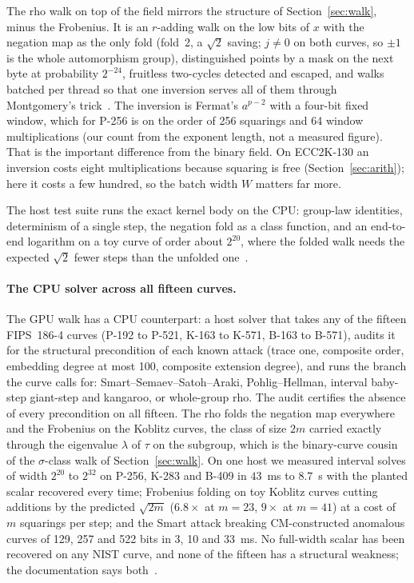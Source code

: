 The rho walk on top of the field mirrors the structure of
Section~\ref{sec:walk}, minus the Frobenius. It is an $r$-adding walk
on the low bits of $x$ with the negation map as the only fold (fold~2,
a $\sqrt2$ saving; $j\neq0$ on both curves, so $\pm1$ is the whole
automorphism group), distinguished points by a mask on the next byte
at probability $2^{-24}$, fruitless two-cycles detected and escaped,
and walks batched per thread so that one inversion serves all of
them through Montgomery's trick~. The
inversion is Fermat's $a^{p-2}$ with a four-bit fixed window, which
for P-256 is on the order of 256 squarings and 64 window
multiplications (our count from the exponent length, not a measured
figure). That is the important difference from the binary field. On
ECC2K-130 an inversion costs eight multiplications because squaring is
free (Section~\ref{sec:arith}); here it costs a few hundred, so the
batch width $W$ matters far more.

The host test suite runs the exact kernel body on the CPU: group-law
identities, determinism of a single step, the negation fold as a
class function, and an end-to-end logarithm on a toy curve of order
about $2^{20}$, where the folded walk needs the expected $\sqrt2$
fewer steps than the unfolded one~.

\paragraph{The CPU solver across all fifteen curves.} The GPU walk has a CPU
counterpart: a host solver that takes any of the fifteen FIPS~186-4
curves (P-192 to P-521, K-163 to K-571, B-163 to B-571), audits it
for the structural precondition of each known attack (trace one,
composite order, embedding degree at most 100, composite extension
degree), and runs the branch the curve calls for:
Smart--Semaev--Satoh--Araki, Pohlig--Hellman, interval baby-step
giant-step and kangaroo, or whole-group rho. The audit certifies the
absence of every precondition on all fifteen. The rho folds the
negation map everywhere and the Frobenius on the Koblitz curves, the
class of size $2m$ carried exactly through the eigenvalue $\lambda$
of $\tau$ on the subgroup, which is the binary-curve cousin of the
$\sigma$-class walk of Section~\ref{sec:walk}. On one host we measured
interval solves of width $2^{20}$ to $2^{32}$ on P-256, K-283 and
B-409 in $43$~ms to $8.7$~s with the planted scalar recovered every
time; Frobenius folding on toy Koblitz curves cutting additions by
the predicted $\sqrt{2m}$ ($6.8\times$ at $m=23$, $9\times$ at
$m=41$) at a cost of $m$ squarings per step; and the Smart attack
breaking CM-constructed anomalous curves of 129, 257 and 522 bits in
3, 10 and 33~ms. No full-width scalar has been recovered on any NIST curve, and
none of the fifteen has a structural weakness; the documentation says
both~.

